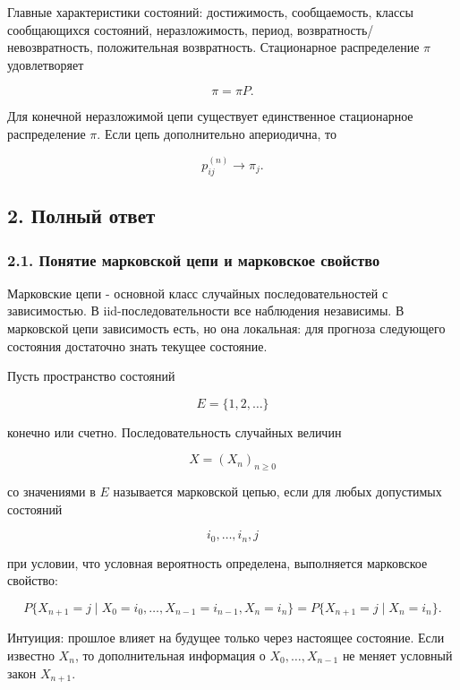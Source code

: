 \documentclass[
  11pt,
  a4paper,
]{article}
\begin{document}
Главные характеристики состояний: достижимость, сообщаемость, классы
сообщающихся состояний, неразложимость, период,
возвратность/невозвратность, положительная возвратность. Стационарное
распределение \(\pi\) удовлетворяет

\[
\pi=\pi P.
\]

Для конечной неразложимой цепи существует единственное стационарное
распределение \(\pi\). Если цепь дополнительно апериодична, то

\[
p_{ij}^{(n)}\to\pi_j.
\]

\subsection{2. Полный
ответ}\label{ux43fux43eux43bux43dux44bux439-ux43eux442ux432ux435ux442}

\subsubsection{2.1. Понятие марковской цепи и марковское
свойство}\label{ux43fux43eux43dux44fux442ux438ux435-ux43cux430ux440ux43aux43eux432ux441ux43aux43eux439-ux446ux435ux43fux438-ux438-ux43cux430ux440ux43aux43eux432ux441ux43aux43eux435-ux441ux432ux43eux439ux441ux442ux432ux43e}

Марковские цепи - основной класс случайных последовательностей с
зависимостью. В iid-последовательности все наблюдения независимы. В
марковской цепи зависимость есть, но она локальная: для прогноза
следующего состояния достаточно знать текущее состояние.

Пусть пространство состояний

\[
E=\{1,2,\ldots\}
\]

конечно или счетно. Последовательность случайных величин

\[
X=(X_n)_{n\ge0}
\]

со значениями в \(E\) называется марковской цепью, если для любых
допустимых состояний

\[
i_0,\ldots,i_n,j
\]

при условии, что условная вероятность определена, выполняется марковское
свойство:

\[
P\{X_{n+1}=j\mid X_0=i_0,\ldots,X_{n-1}=i_{n-1},X_n=i_n\}
=
P\{X_{n+1}=j\mid X_n=i_n\}.
\]

Интуиция: прошлое влияет на будущее только через настоящее состояние.
Если известно \(X_n\), то дополнительная информация о
\(X_0,\ldots,X_{n-1}\) не меняет условный закон \(X_{n+1}\).
\end{document}
